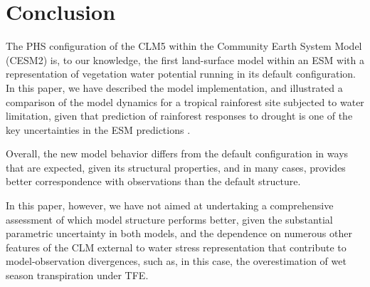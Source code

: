 \documentclass[draft,linenumbers]{agujournal}
\begin{document}
\section{Conclusion}

    The PHS configuration of the CLM5 within the Community Earth System Model (CESM2) is, to our knowledge, the first land-surface model within an ESM with a representation of vegetation water potential running in its default configuration. In this paper, we have described the model implementation, and illustrated a comparison of the model dynamics for a tropical rainforest site subjected to water limitation, given that prediction of rainforest responses to drought is one of the key uncertainties in the ESM predictions \citep{huntingford2013}. 
    
    Overall, the new model behavior differs from the default configuration in ways that are expected, given its structural properties, and in many cases, provides better correspondence with observations than the default structure. 
    
     In this paper, however, we have not aimed at undertaking a comprehensive assessment of which model structure performs better, given the substantial parametric uncertainty in both models, and the dependence on numerous other features of the CLM external to water stress representation that contribute to model-observation divergences, such as, in this case, the overestimation of wet season transpiration under TFE. 
    
\end{document}

